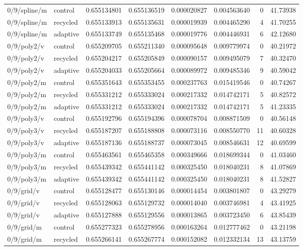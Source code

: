 \begin{longtable}{llrrrrrr}
0/9/spline/m & control & 0.655134801 & 0.655136519 & 0.000020827 & 0.004563640 & 0 & 41.73938 \\
0/9/spline/m & recycled & 0.655133913 & 0.655135631 & 0.000019939 & 0.004465290 & 4 & 41.70255 \\
0/9/spline/m & adaptive & 0.655133749 & 0.655135468 & 0.000019776 & 0.004446931 & 6 & 42.12680 \\
0/9/poly2/v & control & 0.655209705 & 0.655211340 & 0.000095648 & 0.009779974 & 0 & 40.21972 \\
0/9/poly2/v & recycled & 0.655204217 & 0.655205849 & 0.000090157 & 0.009495079 & 7 & 40.32470 \\
0/9/poly2/v & adaptive & 0.655204033 & 0.655205664 & 0.000089972 & 0.009485346 & 9 & 40.59042 \\
0/9/poly2/m & control & 0.655351643 & 0.655353455 & 0.000237763 & 0.015419546 & 0 & 40.74267 \\
0/9/poly2/m & recycled & 0.655331212 & 0.655333024 & 0.000217332 & 0.014742171 & 5 & 40.82572 \\
0/9/poly2/m & adaptive & 0.655331212 & 0.655333024 & 0.000217332 & 0.014742171 & 5 & 41.23335 \\
0/9/poly3/v & control & 0.655192796 & 0.655194396 & 0.000078704 & 0.008871509 & 0 & 40.56148 \\
0/9/poly3/v & recycled & 0.655187207 & 0.655188808 & 0.000073116 & 0.008550770 & 11 & 40.60328 \\
0/9/poly3/v & adaptive & 0.655187136 & 0.655188737 & 0.000073045 & 0.008546631 & 12 & 40.69599 \\
0/9/poly3/m & control & 0.655463561 & 0.655465358 & 0.000349666 & 0.018699344 & 0 & 41.03460 \\
0/9/poly3/m & recycled & 0.655439342 & 0.655441142 & 0.000325450 & 0.018040231 & 8 & 41.07869 \\
0/9/poly3/m & adaptive & 0.655439342 & 0.655441142 & 0.000325450 & 0.018040231 & 8 & 41.52827 \\
0/9/grid/v & control & 0.655128477 & 0.655130146 & 0.000014454 & 0.003801807 & 0 & 43.29279 \\
0/9/grid/v & recycled & 0.655128063 & 0.655129732 & 0.000014040 & 0.003746981 & 4 & 43.41925 \\
0/9/grid/v & adaptive & 0.655127888 & 0.655129556 & 0.000013865 & 0.003723450 & 6 & 43.85439 \\
0/9/grid/m & control & 0.655277323 & 0.655278956 & 0.000163264 & 0.012777462 & 0 & 43.21198 \\
0/9/grid/m & recycled & 0.655266141 & 0.655267774 & 0.000152082 & 0.012332134 & 13 & 43.13759 \\

\end{longtable}
